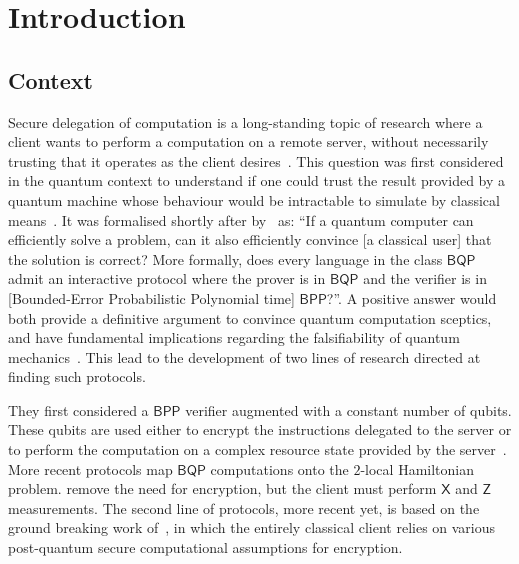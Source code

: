 \documentclass[12pt]{iopart}
\newcommand{\cptp}[1]{\mathsf{#1}} \newcommand{\pd}[1]{\mathcal{#1}}  \newcommand{\sch}[1]{\bm{#1}}
\newcommand{\X}{\cptp{X}}
\newcommand{\Z}{\cptp{Z}}
\renewcommand{\1}{\mathds{1}}
\begin{document}
\maketitle



\newpage

\section{Introduction}
\label{sec:intro}
\subsection{Context}
Secure delegation of computation is a long-standing topic of research where a client wants to perform a computation on a remote server, without necessarily trusting that it operates as the client desires~\cite{G09:fully,G17:verifiable}. This question was first considered in the quantum context to understand if one could trust the result provided by a quantum machine whose behaviour would be intractable to simulate by classical means~\cite{G04:conference}. It was formalised shortly after by~\cite{A07:scott} as: ``If a quantum computer can efficiently solve a problem, can it also efficiently convince [a classical user] that the solution is correct? More formally, does every language in the class $\mathsf{BQP}$ admit an interactive protocol where the prover is in $\mathsf{BQP}$ and the verifier is in [Bounded-Error Probabilistic Polynomial time] $\mathsf{BPP}$?''. A positive answer would both provide a definitive argument to convince quantum computation sceptics, and have fundamental implications regarding the falsifiability of quantum mechanics~\cite{V07:conference,AV12:is}. This lead to the development of two lines of research directed at finding such protocols.

They first considered a $\mathsf{BPP}$ verifier augmented with a constant number of qubits. These qubits are used either to encrypt the instructions delegated to the server or to perform the computation on a complex resource state provided by the server~\cite{ABE10:interactive,ABEM17:interactive,FK17:unconditionally,B15:how,HM15:verifiable}. More recent protocols map $\mathsf{BQP}$ computations onto the $2$-local Hamiltonian problem. \cite{FHM18:post,HKSE17:direct} remove the need for encryption, but the client must perform $\X$ and $\Z$ measurements. The second line of protocols, more recent yet, is based on the ground breaking work of~\cite{M18:classical}, in which the entirely classical client relies on various post-quantum secure computational assumptions for encryption.
\end{document}
